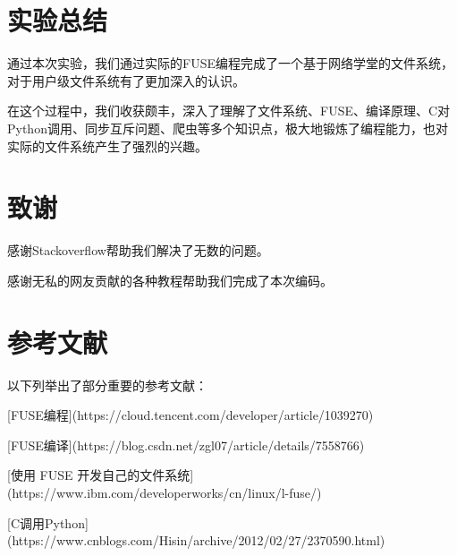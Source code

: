 \section{实验总结}

通过本次实验，我们通过实际的FUSE编程完成了一个基于网络学堂的文件系统，对于用户级文件系统有了更加深入的认识。

在这个过程中，我们收获颇丰，深入了理解了文件系统、FUSE、编译原理、C对Python调用、同步互斥问题、爬虫等多个知识点，极大地锻炼了编程能力，也对实际的文件系统产生了强烈的兴趣。

\section{致谢}

感谢Stackoverflow帮助我们解决了无数的问题。

感谢无私的网友贡献的各种教程帮助我们完成了本次编码。

\section{参考文献}

以下列举出了部分重要的参考文献：

[FUSE编程](https://cloud.tencent.com/developer/article/1039270)

[FUSE编译](https://blog.csdn.net/zgl07/article/details/7558766)

[使用 FUSE 开发自己的文件系统](https://www.ibm.com/developerworks/cn/linux/l-fuse/)

[C调用Python](https://www.cnblogs.com/Hisin/archive/2012/02/27/2370590.html)




